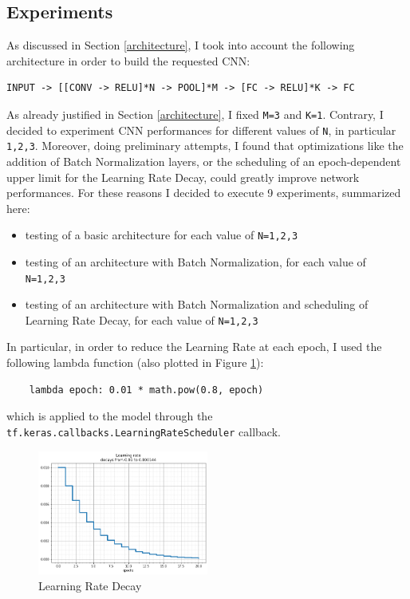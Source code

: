 \documentclass{article}
\begin{document}
\subsection{Experiments}
As discussed in Section \ref{architecture}, I took into account the following architecture in order to build the requested CNN:
\begin{verbatim}
INPUT -> [[CONV -> RELU]*N -> POOL]*M -> [FC -> RELU]*K -> FC
\end{verbatim}
As already justified in Section \ref{architecture}, I fixed \texttt{M=3} and \texttt{K=1}.
Contrary, I decided to experiment CNN performances for different values of \texttt{N}, in particular \texttt{1,2,3}.
Moreover, doing preliminary attempts, I found that optimizations like the addition of Batch Normalization layers, or the scheduling of an epoch-dependent upper limit for the Learning Rate Decay, could greatly improve network performances.
For these reasons I decided to execute 9 experiments, summarized here:
\begin{itemize}
    \item testing of a basic architecture for each value of \texttt{N=1,2,3}
    \item testing of an architecture with Batch Normalization, for each value of \texttt{N=1,2,3}
    \item testing of an architecture with Batch Normalization and scheduling of Learning Rate Decay, for each value of \texttt{N=1,2,3}
\end{itemize}

\noindent In particular, in order to reduce the Learning Rate at each epoch, I used the following lambda function (also plotted in Figure \ref{fig:lr_decay}):
\begin{verbatim}
    lambda epoch: 0.01 * math.pow(0.8, epoch)
\end{verbatim}
which is applied to the model through the \texttt{tf\-.keras\-.callbacks\-.Learning\-RateScheduler} callback.

\begin{figure}
    \centering
    \includegraphics[width=0.5\textwidth]{lr_decay}
    \caption{Learning Rate Decay}
    \label{fig:lr_decay}
\end{figure}
\end{document}
